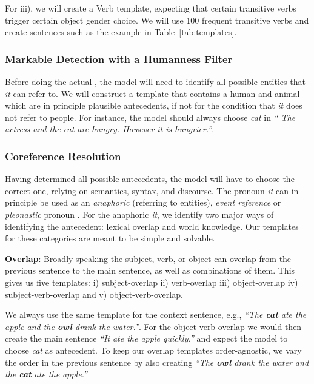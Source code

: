 For iii), we will create a Verb template, expecting that certain transitive verbs trigger certain object gender choice. 
%
We will use 100 frequent transitive verbs and create sentences such as the example in Table~\ref{tab:templates}.


\subsubsection{Markable Detection with a Humanness Filter}
Before doing the actual \coref{}, the model will need to identify all possible entities that \textit{it} can refer to. 
%
We will construct a template that contains a human and animal which are in principle plausible antecedents, if not for the condition that \emph{it} does not refer to people. 
%
For instance, the model should always choose \emph{cat} in \textit{`` The \emph{actress} and the \emph{cat} are hungry. However \emph{it} is hungrier.''}. 

\subsubsection{Coreference Resolution}
Having determined all possible antecedents, the model will have to choose the correct one, relying on semantics, syntax, and discourse.
%
The pronoun \textit{it} can in principle be used as an \emph{anaphoric} (referring to entities), \emph{event reference} or \emph{pleonastic} pronoun \citep{loaiciga-etal-2017-disambiguating}.
%
For the anaphoric \textit{it}, we identify two major ways of identifying the antecedent: lexical overlap and world knowledge.  
%
Our templates for these categories are meant to be simple and solvable.  

\textbf{Overlap}: Broadly speaking the subject, verb, or object can overlap from the previous sentence to the main sentence, as well as combinations of them. 
%
This gives us five templates: i) subject-overlap ii) verb-overlap iii) object-overlap iv) subject-verb-overlap and v) object-verb-overlap.

%
We always use the same template for the context sentence, e.g., \textit{``The \textbf{cat} ate the apple and the \textbf{owl} drank the water.''}. 
%
For the object-verb-overlap we would then create the main sentence \textit{``It ate the apple quickly.''} and expect the model to choose \emph{cat} as antecedent.
%
To keep our overlap templates order-agnostic, we vary the order in the previous sentence by also creating \textit{``The \textbf{owl} drank the water and the \textbf{cat} ate the apple.''}

